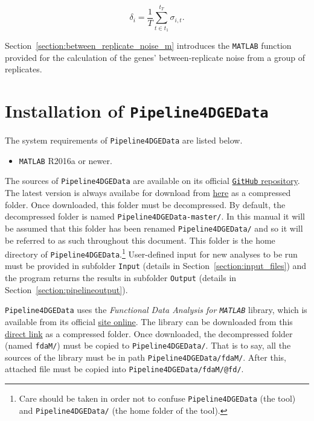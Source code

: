 \documentclass[final,letterpaper,12pt]{article}
\begin{document}
\begin{equation}
\label{equation:between_replicate_noise}
\delta_i = \frac{1}{T} \sum_{t \in t_1}^{t_T} \sigma_{i,t}.
\end{equation}

\par Section~\ref{section:between_replicate_noise_m} introduces the \texttt{MATLAB} function provided for the calculation of the genes' between-replicate noise from a group of replicates.

\section{Installation of \texttt{Pipeline4DGEData}}
\label{section:Installation}

\par The system requirements of \texttt{Pipeline4DGEData} are listed below.

\begin{itemize}

\item \texttt{MATLAB} R2016a or newer.

\end{itemize}

\par The sources of \texttt{Pipeline4DGEData} are available on its official \href{https://github.com/j142857z/Pipeline4DGEData}{\texttt{GitHub} repository}. The latest version is always availabe for download from \href{https://github.com/j142857z/Pipeline4DGEData/archive/master.zip}{here} as a compressed folder. Once downloaded, this folder must be decompressed. By default, the decompressed folder is named \texttt{Pipeline4DGEData-master/}. In this manual it will be assumed that this folder has been renamed \texttt{Pipeline4DGEData/} and so it will be referred to as such throughout this document. This folder is the home directory of \texttt{Pipeline4DGEData}.\footnote{Care should be taken in order not to confuse \texttt{Pipeline4DGEData} (the tool) and \texttt{Pipeline4DGEData/} (the home folder of the tool).} User-defined input for new analyses to be run must be provided in subfolder \texttt{Input} (details in Section~\ref{section:input_files}) and the program returns the results in subfolder \texttt{Output} (details in Section~\ref{section:pipelineoutput}).

\par \texttt{Pipeline4DGEData} uses the \textit{Functional Data Analysis for \texttt{MATLAB}} library, which is available from its official \href{http://www.psych.mcgill.ca/misc/fda/}{site online}. The library can be downloaded from this \href{http://www.psych.mcgill.ca/misc/fda/downloads/FDAfuns/Matlab/fdaMatlab.zip}{direct link} as a compressed folder. Once downloaded, the decompressed folder (named \texttt{fdaM/}) must be copied to \texttt{Pipeline4DGEData/}. That is to say, all the sources of the library must be in path \texttt{Pipeline4DGEData/fdaM/}. After this, attached file   must be copied into \texttt{Pipeline4DGEData/fdaM/@fd/}.
\end{document}

